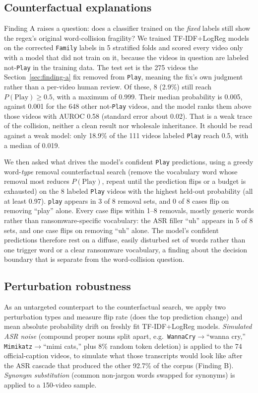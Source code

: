 \documentclass[preprint,12pt]{elsarticle}
\begin{document}
\subsection{Counterfactual explanations}
\label{sec:counterfactual}
Finding A raises a question: does a classifier trained on the \emph{fixed}
labels still show the regex's original word-collision fragility? We trained
TF-IDF+LogReg models on the corrected \texttt{Family} labels in 5 stratified
folds and scored every video only with a model that did not train on it,
because the videos in question are labeled not-\texttt{Play} in the training
data. The test set is the 275
videos the Section~\ref{sec:finding-a} fix removed from \texttt{Play},
meaning the fix's own judgment rather than a per-video human review. Of
these, 8 (2.9\%) still reach $P(\text{Play})\geq 0.5$, with a maximum of
0.999. Their median probability is 0.005, against 0.001 for the 648 other
not-\texttt{Play} videos, and the model ranks them above those videos with
AUROC 0.58 (standard error about 0.02). That is a weak trace of the
collision, neither a clean result nor wholesale inheritance. It should be read
against a weak model: only 18.9\% of the 111
videos labeled \texttt{Play} reach 0.5, with a median of 0.019.

We then asked what drives the model's confident \texttt{Play} predictions,
using a greedy word-\emph{type} removal counterfactual search (remove the
vocabulary word whose removal most reduces $P(\text{Play})$, repeat until the
prediction flips or a budget is exhausted) on the 8 labeled \texttt{Play}
videos with the highest held-out probability (all at least 0.97).
\texttt{play} appears in 3 of 8 removal sets, and 0 of 8 cases flip on removing
``play'' alone. Every case flips within 1--8 removals, mostly generic words
rather than ransomware-specific vocabulary: the ASR filler ``uh'' appears in 5
of 8 sets, and one case flips on removing ``uh'' alone. The model's confident
predictions therefore rest on a diffuse, easily disturbed set of words rather
than one trigger word or a clear ransomware vocabulary, a finding about the
decision boundary that is separate from the word-collision question.

\subsection{Perturbation robustness}
\label{sec:perturbation}
As an untargeted counterpart to the counterfactual search, we apply two
perturbation types and measure flip rate (does the top prediction change) and
mean absolute probability drift on freshly fit TF-IDF+LogReg models.
\emph{Simulated ASR noise} (compound proper nouns split apart, e.g.\
\texttt{WannaCry}$\to$``wanna cry,'' \texttt{Mimikatz}$\to$``mimi cats,''
plus 8\% random token deletion) is applied to the 74 official-caption videos,
to simulate what those transcripts would look like after the ASR cascade that
produced the other 92.7\% of the corpus (Finding B). \emph{Synonym
substitution} (common non-jargon words swapped for synonyms) is applied to a
150-video sample.
\end{document}
